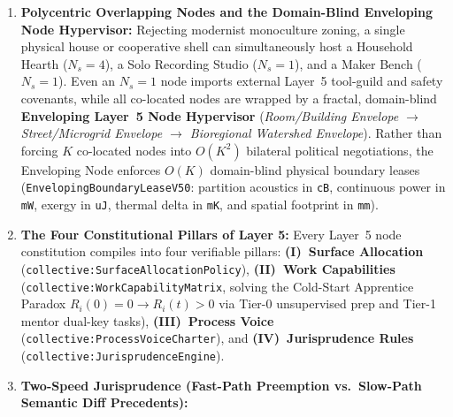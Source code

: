 \begin{enumerate}
        guarantees that no single high-reputation engineer can outvote the collective civic
        floor). External consumers ($N_p$, such as $500$ neighborhood bread eaters) \textit{never}
        vote on a $5$-person Bakery Guild's starter hydration or oven schedules; instead, local
        \texttt{col-kmsd} strips personal DIDs via \texttt{BBS+} ring-membership zero-knowledge
        proofs from \textit{The Pantry}'s appetite vectors and short-lived auto-expiring pickup
        leases (\texttt{AnonymousAppetiteLeaseV50}), while bakers dedicate $8{,}500\,\mathrm{bp}$
        ($85\%$) of oven capacity to verified staples and $1{,}500\,\mathrm{bp}$ ($15\%$) to
        compositional \textit{montage} experiments (\textbf{The Dual-Loop Bakery}).
\item \textbf{Polycentric Overlapping Nodes and the Domain-Blind Enveloping Node Hypervisor:}
        Rejecting modernist monoculture zoning, a single physical house or cooperative shell can
        simultaneously host a Household Hearth ($N_s = 4$), a Solo Recording Studio ($N_s = 1$),
        and a Maker Bench ($N_s = 1$). Even an $N_s = 1$ node imports external Layer~5 tool-guild
        and safety covenants, while all co-located nodes are wrapped by a fractal, domain-blind
        \textbf{Enveloping Layer~5 Node Hypervisor} (\textit{Room/Building Envelope $\to$
        Street/Microgrid Envelope $\to$ Bioregional Watershed Envelope}). Rather than forcing $K$
        co-located nodes into $O(K^2)$ bilateral political negotiations, the Enveloping Node
        enforces $O(K)$ domain-blind physical boundary leases (\texttt{EnvelopingBoundaryLeaseV50}:
        partition acoustics in \texttt{cB}, continuous power in \texttt{mW}, exergy in \texttt{uJ},
        thermal delta in \texttt{mK}, and spatial footprint in \texttt{mm}).
\item \textbf{The Four Constitutional Pillars of Layer 5:} Every Layer~5 node constitution compiles
        into four verifiable pillars: \textbf{(I)~Surface Allocation}
        (\texttt{collective:SurfaceAllocationPolicy}), \textbf{(II)~Work Capabilities}
        (\texttt{collective:WorkCapabilityMatrix}, solving the Cold-Start Apprentice Paradox
        $R_i(0)=0 \to R_i(t)>0$ via Tier-0 unsupervised prep and Tier-1 mentor dual-key tasks),
        \textbf{(III)~Process Voice} (\texttt{collective:ProcessVoiceCharter}), and
        \textbf{(IV)~Jurisprudence Rules} (\texttt{collective:JurisprudenceEngine}).
\item \textbf{Two-Speed Jurisprudence (Fast-Path Preemption vs.\ Slow-Path Semantic Diff Precedents):}

\end{enumerate}
